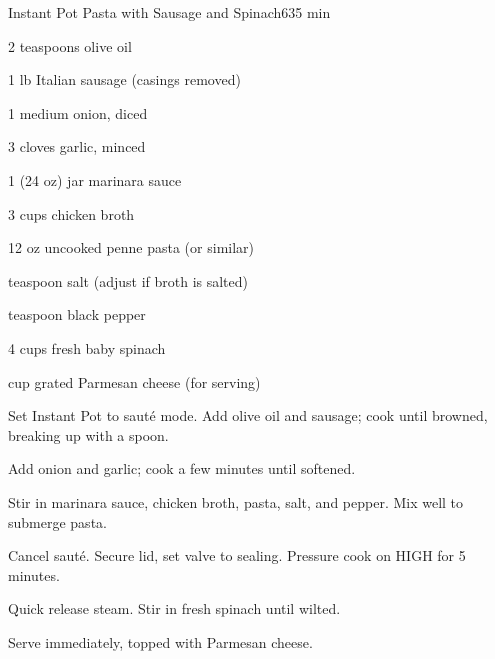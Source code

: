 \begin{recipebox}{Instant Pot Pasta with Sausage and Spinach}{6}{35 min}
  \begin{ingredients}
    \item 2 teaspoons olive oil
    \item 1 lb Italian sausage (casings removed)
    \item 1 medium onion, diced
    \item 3 cloves garlic, minced
    \item 1 (24 oz) jar marinara sauce
    \item 3 cups chicken broth
    \item 12 oz uncooked penne pasta (or similar)
    \item {} teaspoon salt (adjust if broth is salted)
    \item {} teaspoon black pepper
    \item 4 cups fresh baby spinach
    \item {} cup grated Parmesan cheese (for serving)
  \end{ingredients}

  \begin{method}
    \item Set Instant Pot to sauté mode. Add olive oil and sausage; cook until browned, breaking up with a spoon.
    \item Add onion and garlic; cook a few minutes until softened.
    \item Stir in marinara sauce, chicken broth, pasta, salt, and pepper. Mix well to submerge pasta.
    \item Cancel sauté. Secure lid, set valve to sealing. Pressure cook on HIGH for 5 minutes.
    \item Quick release steam. Stir in fresh spinach until wilted.
    \item Serve immediately, topped with Parmesan cheese.
  \end{method}
\end{recipebox}
